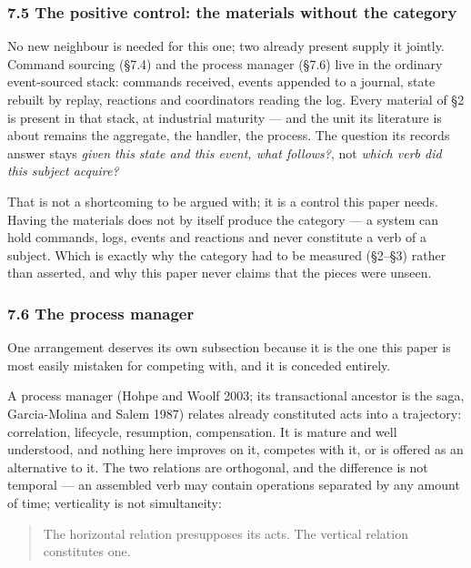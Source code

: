 \documentclass[
]{article}
\begin{document}
\subsubsection{7.5 The positive control: the materials without the
category}\label{the-positive-control-the-materials-without-the-category}

No new neighbour is needed for this one; two already present supply it
jointly. Command sourcing (§7.4) and the process manager (§7.6) live in
the ordinary event-sourced stack: commands received, events appended to
a journal, state rebuilt by replay, reactions and coordinators reading
the log. Every material of §2 is present in that stack, at industrial
maturity --- and the unit its literature is about remains the aggregate,
the handler, the process. The question its records answer stays
\emph{given this state and this event, what follows?}, not \emph{which
verb did this subject acquire?}

That is not a shortcoming to be argued with; it is a control this paper
needs. Having the materials does not by itself produce the category ---
a system can hold commands, logs, events and reactions and never
constitute a verb of a subject. Which is exactly why the category had to
be measured (§2--§3) rather than asserted, and why this paper never
claims that the pieces were unseen.

\subsubsection{7.6 The process manager}\label{the-process-manager}

One arrangement deserves its own subsection because it is the one this
paper is most easily mistaken for competing with, and it is conceded
entirely.

A process manager (Hohpe and Woolf 2003; its transactional ancestor is
the saga, Garcia-Molina and Salem 1987) relates already constituted acts
into a trajectory: correlation, lifecycle, resumption, compensation. It
is mature and well understood, and nothing here improves on it, competes
with it, or is offered as an alternative to it. The two relations are
orthogonal, and the difference is not temporal --- an assembled verb may
contain operations separated by any amount of time; verticality is not
simultaneity:

\begin{quote}
The horizontal relation presupposes its acts. The vertical relation
constitutes one.
\end{quote}
\end{document}
